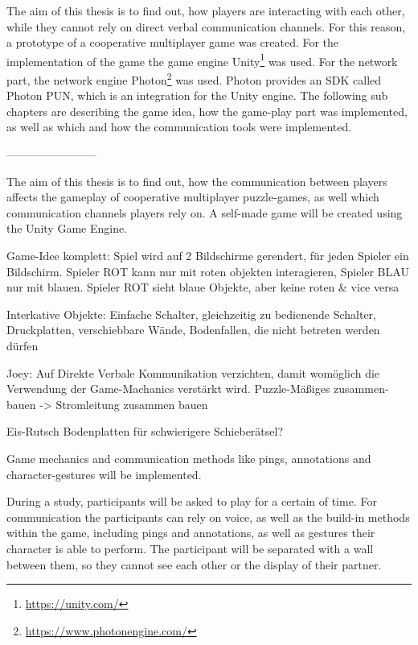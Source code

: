 The aim of this thesis is to find out, how players are interacting with each other, while they cannot rely on direct verbal communication channels.
For this reason, a prototype of a cooperative multiplayer game was created.
For the implementation of the game the game engine Unity\footnote{\url{https://unity.com/}}
was used. 
For the network part, the network engine Photon\footnote{\url{https://www.photonengine.com/}} was used. Photon provides an SDK called Photon PUN, which is an integration for the Unity engine.
The following sub chapters are describing the game idea, how the game-play part was implemented, as well as which and how the communication tools were implemented.



------------------------

The aim of this thesis is to find out, how the communication between players affects the gameplay
of cooperative multiplayer puzzle-games, as well which communication channels players rely
on. 
A self-made game will be created using the Unity Game Engine.


Game-Idee komplett:
Spiel wird auf 2 Bildschirme gerendert, für jeden Spieler ein Bildschirm.
Spieler ROT kann nur mit roten objekten interagieren, Spieler BLAU nur mit blauen.
Spieler ROT sieht blaue Objekte, aber keine roten \& vice versa

Interkative Objekte: 
Einfache Schalter, gleichzeitig zu bedienende Schalter, Druckplatten, verschiebbare Wände, 
Bodenfallen, die nicht betreten werden dürfen


Joey: Auf Direkte Verbale Kommunikation verzichten, damit womöglich die Verwendung der Game-Machanics verstärkt wird. Puzzle-Mäßiges zusammen-bauen -> Stromleitung zusammen bauen

Eis-Rutsch Bodenplatten für schwierigere Schieberätsel?






Game mechanics and communication methods like pings, annotations and character-gestures
will be implemented. 

During a study, participants will be asked to play for a certain of time.
For communication the participants can rely on voice, as well as the build-in methods within
the game, including pings and annotations, as well as gestures their character is able to perform.
The participant will be separated with a wall between them, so they cannot see each other or
the display of their partner.





